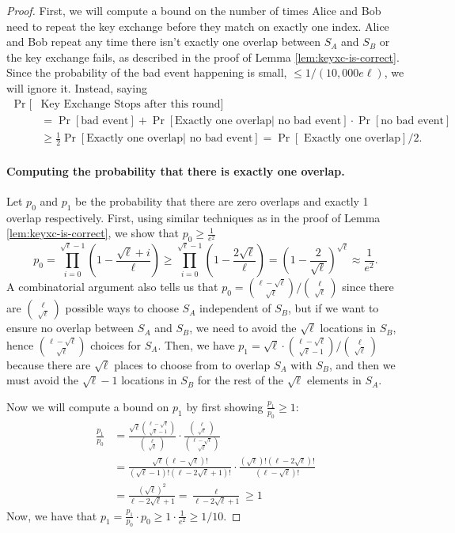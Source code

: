 \begin{proof}
	First, we will compute a bound on the number of times Alice and Bob need to repeat the key exchange before they match on exactly one index. Alice and Bob repeat any time there isn't exactly one overlap between $S_A$ and $S_B$ or the key exchange fails, as described in the proof of Lemma \ref{lem:keyxc-is-correct}. Since the probability of the bad event happening is small, $\le 1/(10,000 e \ell)$, we will ignore it. Instead, saying
	\begin{align*}
	\Pr[&\mbox{Key Exchange Stops after this round}]\\
	&= \Pr[\mbox{bad event}] + \Pr[\mbox{Exactly one overlap} | \mbox{ no bad event}] \cdot\Pr[\mbox{no bad event}]\\
	&\ge \frac 1 2 \Pr[\mbox{Exactly one overlap} | \mbox{ no bad event}] = \Pr[\mbox{ Exactly one overlap}]/2.
	\end{align*}
	
	\paragraph{Computing the probability that there is exactly one overlap.} Let $p_0$ and $p_1$ be the probability that there are zero overlaps and exactly 1 overlap respectively. First, using similar techniques as in the proof of Lemma \ref{lem:keyxc-is-correct}, we show that $p_0 \ge \frac 1 {e^2}$
	\[ 
	 p_0 %
	 = \prod_{i=0}^{\sqrt \ell-1} (1 - \frac{\sqrt{\ell} + i}{\ell})
	\ge \prod_{i=0}^{\sqrt{\ell} - 1} \left( 1 - \frac{2\sqrt{\ell}}{\ell} \right)
	= \left( 1 - \frac{2}{\sqrt{\ell}} \right)^{\sqrt{\ell}} \approx \frac{1}{e^2}.
	\]
	A combinatorial argument also tells us that $p_0 = \binom{\ell - \sqrt{\ell}}{\sqrt{\ell}} / \binom{\ell}{\sqrt{\ell}}$ since there are $\binom{\ell}{\sqrt{\ell}}$ possible ways to choose $S_A$ independent of $S_B$, but if we want to ensure no overlap between $S_A$ and $S_B$, we need to avoid the $\sqrt{\ell}$ locations in $S_B$, hence $\binom{\ell - \sqrt{\ell}}{\sqrt{\ell}}$ choices for $S_A$. Then, we have $p_1 = \sqrt{\ell} \cdot \binom{\ell - \sqrt{\ell}}{\sqrt{\ell} - 1} / \binom{\ell}{\sqrt{\ell}}$ because there are $\sqrt{\ell}$ places to choose from to overlap $S_A$ with $S_B$, and then we must avoid the $\sqrt{\ell} - 1$ locations in $S_B$ for the rest of the $\sqrt{\ell}$ elements in $S_A$.
	
	Now we will compute a bound on $p_1$ by first showing $\frac{p_1}{p_0} \ge 1$:
	\begin{align*}
	\frac{p_1}{p_0} &= \frac{\sqrt \ell \binom{\ell - \sqrt \ell}{\sqrt \ell - 1}}{\binom \ell {\sqrt \ell}} \cdot \frac{\binom \ell {\sqrt \ell}}{ \binom {\ell - \sqrt \ell}{\sqrt \ell} }\\
	&= \frac{\sqrt \ell (\ell - \sqrt \ell)!}{(\sqrt \ell - 1)!(\ell - 2\sqrt \ell + 1)!} \cdot \frac{(\sqrt \ell)!(\ell - 2\sqrt \ell)!}{(\ell - \sqrt \ell)!}\\
	&= \frac{(\sqrt \ell)^2}{\ell - 2 \sqrt \ell + 1} = \frac{\ell}{\ell - 2\sqrt \ell + 1} \ge 1
	\end{align*}
	Now, we have that $p_1 = \frac{p_1}{p_0} \cdot p_0 \ge 1 \cdot \frac{1}{e^2} \ge 1 / 10$.
	

\end{proof}
